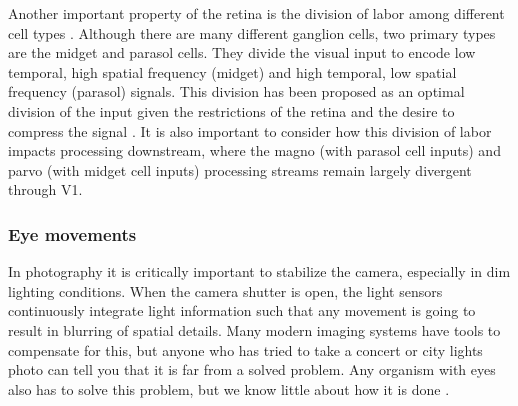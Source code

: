 Another important property of the retina is the division of labor among different cell types \parencite{van1995information}.
Although there are many different ganglion cells, two primary types are the midget and parasol cells.
They divide the visual input to encode low temporal, high spatial frequency (midget) and high temporal, low spatial frequency (parasol) signals.
This division has been proposed as an optimal division of the input given the restrictions of the retina and the desire to compress the signal \parencite{mcintosh2016deep, van1995information}.
It is also important to consider how this division of labor impacts processing downstream, where the magno (with parasol cell inputs) and parvo (with midget cell inputs) processing streams remain largely divergent through V1.

\subsubsection{Eye movements}
In photography it is critically important to stabilize the camera, especially in dim lighting conditions.
When the camera shutter is open, the light sensors continuously integrate light information such that any movement is going to result in blurring of spatial details.
Many modern imaging systems have tools to compensate for this, but anyone who has tried to take a concert or city lights photo can tell you that it is far from a solved problem.
Any organism with eyes also has to solve this problem, but we know little about how it is done \parencite{olshausen2010does, burak2010bayesian}.

